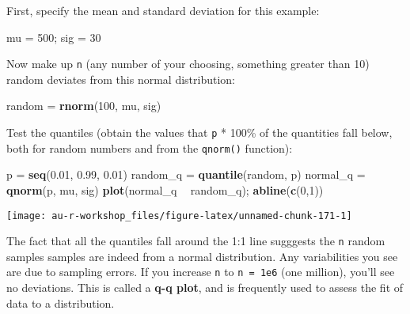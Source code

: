 \documentclass[]{book}
\newenvironment{Shaded}{\begin{snugshade}}{\end{snugshade}}
\newcommand{\KeywordTok}[1]{\textcolor[rgb]{0.13,0.29,0.53}{\textbf{#1}}}
\newcommand{\DecValTok}[1]{\textcolor[rgb]{0.00,0.00,0.81}{#1}}
\newcommand{\FloatTok}[1]{\textcolor[rgb]{0.00,0.00,0.81}{#1}}
\newcommand{\StringTok}[1]{\textcolor[rgb]{0.31,0.60,0.02}{#1}}
\newcommand{\OperatorTok}[1]{\textcolor[rgb]{0.81,0.36,0.00}{\textbf{#1}}}
\newcommand{\NormalTok}[1]{#1}
\theoremstyle{definition}
\theoremstyle{definition}
\theoremstyle{definition}
\theoremstyle{remark}
\begin{document}
First, specify the mean and standard deviation for this example:

\begin{Shaded}
\begin{Highlighting}[]
\NormalTok{mu =}\StringTok{ }\DecValTok{500}\NormalTok{; sig =}\StringTok{ }\DecValTok{30}
\end{Highlighting}
\end{Shaded}

Now make up \texttt{n} (any number of your choosing, something greater
than 10) random deviates from this normal distribution:

\begin{Shaded}
\begin{Highlighting}[]
\NormalTok{random =}\StringTok{ }\KeywordTok{rnorm}\NormalTok{(}\DecValTok{100}\NormalTok{, mu, sig)}
\end{Highlighting}
\end{Shaded}

Test the quantiles (obtain the values that \texttt{p} * 100\% of the
quantities fall below, both for random numbers and from the
\texttt{qnorm()} function):

\begin{Shaded}
\begin{Highlighting}[]
\NormalTok{p =}\StringTok{ }\KeywordTok{seq}\NormalTok{(}\FloatTok{0.01}\NormalTok{, }\FloatTok{0.99}\NormalTok{, }\FloatTok{0.01}\NormalTok{)}
\NormalTok{random_q =}\StringTok{ }\KeywordTok{quantile}\NormalTok{(random, p)}
\NormalTok{normal_q =}\StringTok{ }\KeywordTok{qnorm}\NormalTok{(p, mu, sig)}
\KeywordTok{plot}\NormalTok{(normal_q }\OperatorTok{~}\StringTok{ }\NormalTok{random_q); }\KeywordTok{abline}\NormalTok{(}\KeywordTok{c}\NormalTok{(}\DecValTok{0}\NormalTok{,}\DecValTok{1}\NormalTok{))}
\end{Highlighting}
\end{Shaded}

\begin{center}\texttt{[image: au-r-workshop\_files/figure-latex/unnamed-chunk-171-1]} \end{center}

The fact that all the quantiles fall around the 1:1 line sugggests the
\texttt{n} random samples samples are indeed from a normal distribution.
Any variabilities you see are due to sampling errors. If you increase
\texttt{n} to \texttt{n\ =\ 1e6} (one million), you'll see no
deviations. This is called a \textbf{q-q plot}, and is frequently used
to assess the fit of data to a distribution.
\end{document}

